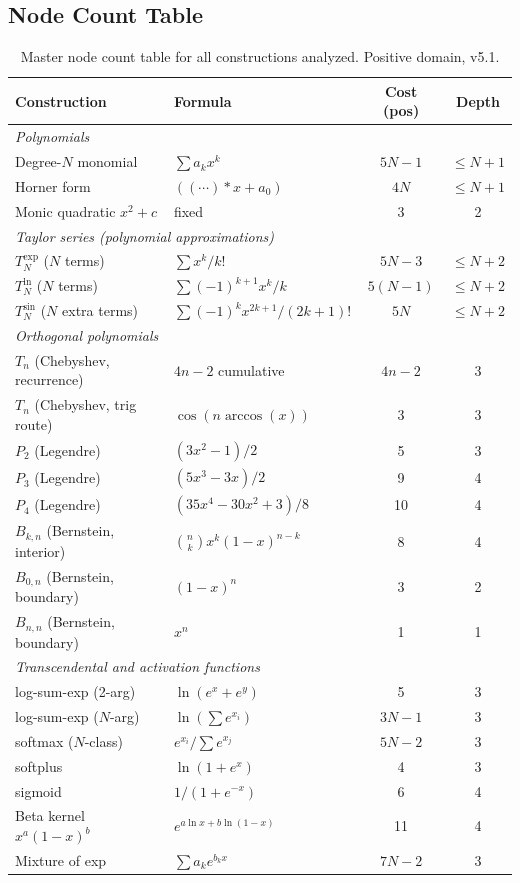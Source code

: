 \documentclass[11pt,a4paper]{article}
\begin{document}
\subsection{Node Count Table}

\begin{table}[h]
\centering
\caption{Master node count table for all constructions analyzed. Positive domain, v5.1.}
\label{tab:summary}
\begin{tabular}{llcc}
\toprule
Construction & Formula & Cost (pos) & Depth \\
\midrule
\multicolumn{4}{l}{\textit{Polynomials}} \\
Degree-$N$ monomial & $\sum a_k x^k$ & $5N - 1$ & $\leq N+1$ \\
Horner form & $((\cdots)*x + a_0)$ & $4N$ & $\leq N+1$ \\
Monic quadratic $x^2+c$ & fixed & 3 & 2 \\
\midrule
\multicolumn{4}{l}{\textit{Taylor series (polynomial approximations)}} \\
$T_N^{\exp}$ ($N$ terms) & $\sum x^k/k!$ & $5N-3$ & $\leq N+2$ \\
$T_N^{\ln}$ ($N$ terms) & $\sum (-1)^{k+1}x^k/k$ & $5(N-1)$ & $\leq N+2$ \\
$T_N^{\sin}$ ($N$ extra terms) & $\sum (-1)^k x^{2k+1}/(2k+1)!$ & $5N$ & $\leq N+2$ \\
\midrule
\multicolumn{4}{l}{\textit{Orthogonal polynomials}} \\
$T_n$ (Chebyshev, recurrence) & $4n-2$ cumulative & $4n-2$ & 3 \\
$T_n$ (Chebyshev, trig route) & $\cos(n\arccos(x))$ & $3$ & 3 \\
$P_2$ (Legendre) & $(3x^2-1)/2$ & 5 & 3 \\
$P_3$ (Legendre) & $(5x^3-3x)/2$ & 9 & 4 \\
$P_4$ (Legendre) & $(35x^4-30x^2+3)/8$ & 10 & 4 \\
$B_{k,n}$ (Bernstein, interior) & $\binom{n}{k}x^k(1-x)^{n-k}$ & 8 & 4 \\
$B_{0,n}$ (Bernstein, boundary) & $(1-x)^n$ & 3 & 2 \\
$B_{n,n}$ (Bernstein, boundary) & $x^n$ & 1 & 1 \\
\midrule
\multicolumn{4}{l}{\textit{Transcendental and activation functions}} \\
log-sum-exp (2-arg) & $\ln(e^x+e^y)$ & 5 & 3 \\
log-sum-exp ($N$-arg) & $\ln(\sum e^{x_i})$ & $3N-1$ & 3 \\
softmax ($N$-class) & $e^{x_i}/\sum e^{x_j}$ & $5N-2$ & 3 \\
softplus & $\ln(1+e^x)$ & 4 & 3 \\
sigmoid & $1/(1+e^{-x})$ & 6 & 4 \\
Beta kernel $x^a(1-x)^b$ & $e^{a\ln x+b\ln(1-x)}$ & 11 & 4 \\
Mixture of exp & $\sum a_k e^{b_k x}$ & $7N-2$ & 3 \\
\bottomrule
\end{tabular}
\end{table}
\end{document}
